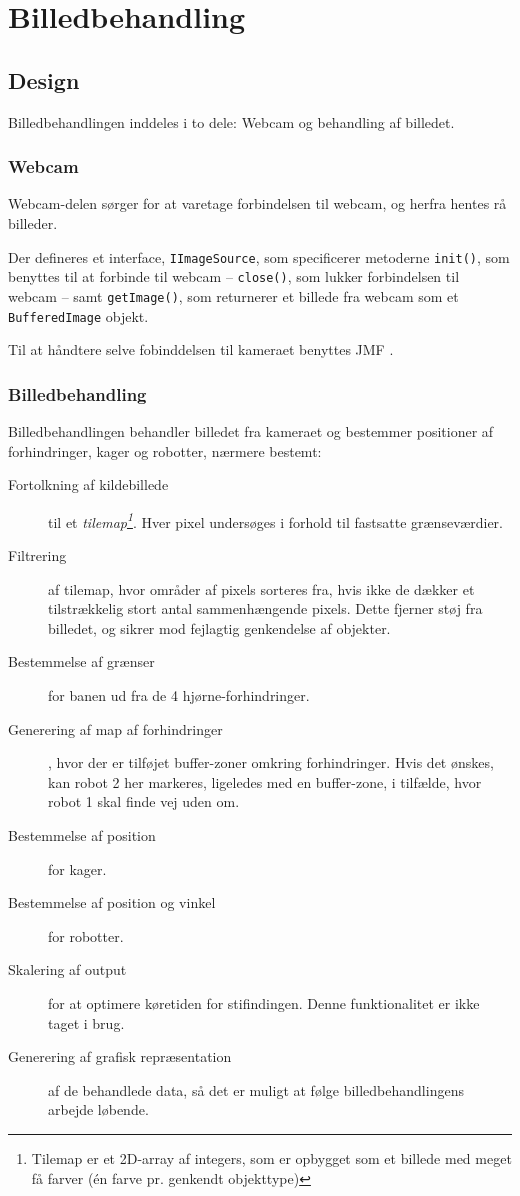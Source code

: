 \chapter{Billedbehandling}\label{cha:ip}
\section{Design}
Billedbehandlingen inddeles i to dele: Webcam og behandling af billedet.

\subsection{Webcam}
Webcam-delen sørger for at varetage forbindelsen til webcam, og herfra hentes rå billeder.

Der defineres et interface, \texttt{IImageSource}, som specificerer metoderne \texttt{init()}, som benyttes til at forbinde til webcam -- \texttt{close()}, som lukker forbindelsen til webcam -- samt \texttt{getImage()}, som returnerer et billede fra webcam som et \texttt{BufferedImage} objekt.

Til at håndtere selve fobinddelsen til kameraet benyttes JMF .

\begin{comment}
Opbygning
	Webcam -> behandling
	JMF
\end{comment}

\subsection{Billedbehandling}
Billedbehandlingen behandler billedet fra kameraet og bestemmer positioner af forhindringer, kager og robotter, nærmere bestemt:
\begin{description}
	\item[Fortolkning af kildebillede] til et \textit{tilemap\footnote{Tilemap er et 2D-array af integers, som er opbygget som et billede med meget få farver (én farve pr. genkendt objekttype)}}. Hver pixel undersøges i forhold til fastsatte grænseværdier.
	\item[Filtrering] af tilemap, hvor områder af pixels sorteres fra, hvis ikke de dækker et tilstrækkelig stort antal sammenhængende pixels. Dette fjerner støj fra billedet, og sikrer mod fejlagtig genkendelse af objekter.
	\item[Bestemmelse af grænser] for banen ud fra de 4 hjørne-forhindringer.
	\item[Generering af map af forhindringer], hvor der er tilføjet buffer-zoner omkring forhindringer. Hvis det ønskes, kan robot 2 her markeres, ligeledes med en buffer-zone, i tilfælde, hvor robot 1 skal finde vej uden om.
	\item[Bestemmelse af position] for kager.
	\item[Bestemmelse af position og vinkel] for robotter.
	\item[Skalering af output] for at optimere køretiden for stifindingen. Denne funktionalitet er ikke taget i brug.
	\item[Generering af grafisk repræsentation] af de behandlede data, så det er muligt at følge billedbehandlingens arbejde løbende.
\end{description}

